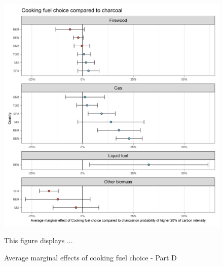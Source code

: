 \documentclass[12pt, a4paper]{article}
\newenvironment{subcaption}
{\strut
\vspace{-5pt}
\begin{minipage}[b]{0.9\textwidth}
  \hspace*{-\parindent}
  \footnotesize}
 {\end{minipage}}
\begin{document}
 \begin{figure}[ht!]
   \centering
   \caption{Average marginal effects of cooking fuel choice - Part D} \label{fig:F9_Charcoal}
   \includegraphics{Analysis_Logit_Models_Marginal_Effects/Average_Marginal_Effects_affected_upper_80_CF_Charcoal}
   \begin{subcaption}
     This figure displays ...
   \end{subcaption}
 \end{figure}

 \clearpage
\end{document}
